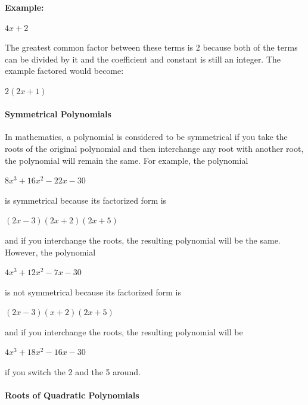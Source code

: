 \textbf{Example:}



$4x + 2$



The greatest common factor between these terms is 2 because both of the terms can be divided by it and the coefficient and constant is still an integer. The example factored would become:



$2(2x + 1)$



\paragraph{Symmetrical Polynomials}



In mathematics, a polynomial is considered to be symmetrical if you take the roots of the original polynomial and then interchange any root with another root, the polynomial will remain the same. For example, the polynomial 



$8x^3 + 16x^2 - 22x - 30$ 



is symmetrical because its factorized form is 



$(2x - 3)(2x + 2)(2x + 5)$ 



and if you interchange the roots, the resulting polynomial will be the same. However, the polynomial 



$4x^3 + 12x^2 - 7x - 30$ 



is not symmetrical because its factorized form is 



$(2x - 3)(x + 2)(2x + 5)$ 



and if you interchange the roots, the resulting polynomial will be 



$4x^3 + 18x^2 - 16x - 30$ 



if you switch the 2 and the 5 around.



\paragraph{Roots of Quadratic Polynomials}



